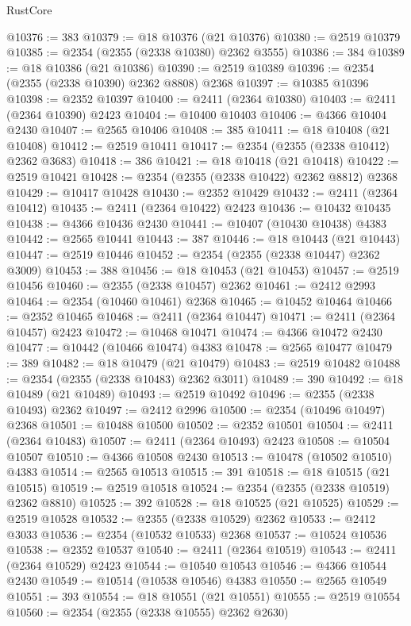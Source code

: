 \begin{lexlean}{RustCore}
\begin{coremodule}
@10376 := 383
@10379 := @18 @10376 (@21 @10376)
@10380 := @2519 @10379
@10385 := @2354 (@2355 (@2338 @10380) @2362 @3555)
@10386 := 384
@10389 := @18 @10386 (@21 @10386)
@10390 := @2519 @10389
@10396 := @2354 (@2355 (@2338 @10390) @2362 @8808) @2368
@10397 := @10385 @10396
@10398 := @2352 @10397
@10400 := @2411 (@2364 @10380)
@10403 := @2411 (@2364 @10390) @2423
@10404 := @10400 @10403
@10406 := @4366 @10404 @2430
@10407 := @2565 @10406
@10408 := 385
@10411 := @18 @10408 (@21 @10408)
@10412 := @2519 @10411
@10417 := @2354 (@2355 (@2338 @10412) @2362 @3683)
@10418 := 386
@10421 := @18 @10418 (@21 @10418)
@10422 := @2519 @10421
@10428 := @2354 (@2355 (@2338 @10422) @2362 @8812) @2368
@10429 := @10417 @10428
@10430 := @2352 @10429
@10432 := @2411 (@2364 @10412)
@10435 := @2411 (@2364 @10422) @2423
@10436 := @10432 @10435
@10438 := @4366 @10436 @2430
@10441 := @10407 (@10430 @10438) @4383
@10442 := @2565 @10441
@10443 := 387
@10446 := @18 @10443 (@21 @10443)
@10447 := @2519 @10446
@10452 := @2354 (@2355 (@2338 @10447) @2362 @3009)
@10453 := 388
@10456 := @18 @10453 (@21 @10453)
@10457 := @2519 @10456
@10460 := @2355 (@2338 @10457) @2362
@10461 := @2412 @2993
@10464 := @2354 (@10460 @10461) @2368
@10465 := @10452 @10464
@10466 := @2352 @10465
@10468 := @2411 (@2364 @10447)
@10471 := @2411 (@2364 @10457) @2423
@10472 := @10468 @10471
@10474 := @4366 @10472 @2430
@10477 := @10442 (@10466 @10474) @4383
@10478 := @2565 @10477
@10479 := 389
@10482 := @18 @10479 (@21 @10479)
@10483 := @2519 @10482
@10488 := @2354 (@2355 (@2338 @10483) @2362 @3011)
@10489 := 390
@10492 := @18 @10489 (@21 @10489)
@10493 := @2519 @10492
@10496 := @2355 (@2338 @10493) @2362
@10497 := @2412 @2996
@10500 := @2354 (@10496 @10497) @2368
@10501 := @10488 @10500
@10502 := @2352 @10501
@10504 := @2411 (@2364 @10483)
@10507 := @2411 (@2364 @10493) @2423
@10508 := @10504 @10507
@10510 := @4366 @10508 @2430
@10513 := @10478 (@10502 @10510) @4383
@10514 := @2565 @10513
@10515 := 391
@10518 := @18 @10515 (@21 @10515)
@10519 := @2519 @10518
@10524 := @2354 (@2355 (@2338 @10519) @2362 @8810)
@10525 := 392
@10528 := @18 @10525 (@21 @10525)
@10529 := @2519 @10528
@10532 := @2355 (@2338 @10529) @2362
@10533 := @2412 @3033
@10536 := @2354 (@10532 @10533) @2368
@10537 := @10524 @10536
@10538 := @2352 @10537
@10540 := @2411 (@2364 @10519)
@10543 := @2411 (@2364 @10529) @2423
@10544 := @10540 @10543
@10546 := @4366 @10544 @2430
@10549 := @10514 (@10538 @10546) @4383
@10550 := @2565 @10549
@10551 := 393
@10554 := @18 @10551 (@21 @10551)
@10555 := @2519 @10554
@10560 := @2354 (@2355 (@2338 @10555) @2362 @2630)

\end{coremodule}
\end{lexlean}
